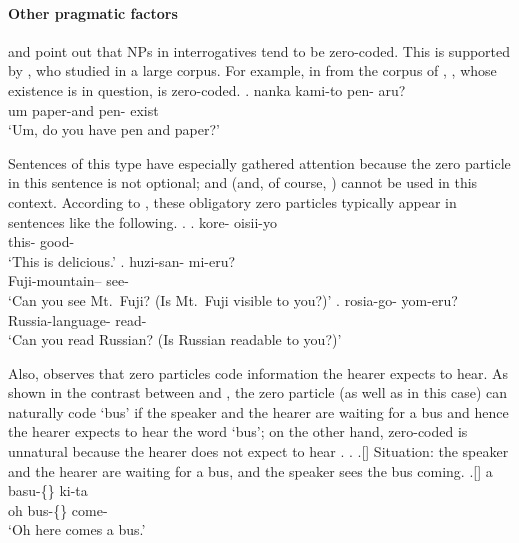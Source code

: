 




\paragraph{Other pragmatic factors}

 and  point out that
NPs in interrogatives tend to be zero-coded.
This is supported by ,
who studied in a large corpus.
For example,
in \Next from the corpus of ,
, whose existence is in question, is zero-coded.
%
\exg. nanka kami-to pen-\EM{\O} aru? \\
      um paper-and pen-\ci{\O} exist \\
      `Um, do you have pen and paper?'
      \hfill{\cite[p.~120]{fry01}}

Sentences of this type have especially gathered attention
because the zero particle in this sentence is not optional;
 and  (and, of course, ) cannot be used in this context.
According to ,
these obligatory zero particles typically appear in sentences like
the following.
%
\ex.
 \ag. kore-\EM{\O} oisii-yo \\
      this-\ci{\O} good- \\
      `This is delicious.'
 \bg. huzi-san-\EM{\O} mi-eru? \\
      Fuji-mountain--\ci{\O} see- \\
      `Can you see Mt.~Fuji? (Is Mt.~Fuji visible to you?)'
 \bg. rosia-go-\EM{\O} yom-eru? \\
      Russia-language-\ci{\O} read- \\
      `Can you read Russian? (Is Russian readable to you?)'
      \hfill{\cite[p.~48]{onoe87}}


Also,  observes that
zero particles code information the hearer expects to hear.
As shown in the contrast between \Next and \NNext,
the zero particle (as well as  in this case) can naturally code  `bus' \Next
if the speaker and the hearer are waiting for a bus and hence
the hearer expects to hear the word  `bus';
on the other hand,
zero-coded  \NNext is unnatural
because the hearer does not expect to hear .
%
\ex.
 \a.[] Situation: the speaker and the hearer are waiting for a bus,
       and the speaker sees the bus coming.
 \bg.[] a basu-\{\} ki-ta \\
      oh bus-\{\} come- \\
      `Oh here comes a bus.'
      \hfill{\cite[p.~120]{tsutsui84}}

